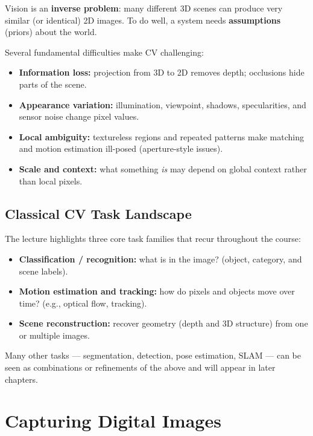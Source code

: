 \documentclass[11pt, oneside]{book}
\begin{document}
\begin{intbox}
Vision is an \textbf{inverse problem}: many different 3D scenes can produce very similar (or identical) 2D images.
To do well, a system needs \textbf{assumptions} (priors) about the world.
\end{intbox}

Several fundamental difficulties make CV challenging:
\begin{itemize}
  \item \textbf{Information loss:} projection from 3D to 2D removes depth; occlusions hide parts of the scene.
  \item \textbf{Appearance variation:} illumination, viewpoint, shadows, specularities, and sensor noise change pixel values.
  \item \textbf{Local ambiguity:} textureless regions and repeated patterns make matching and motion estimation ill-posed (aperture-style issues).
  \item \textbf{Scale and context:} what something \emph{is} may depend on global context rather than local pixels.
\end{itemize}

\section{Classical CV Task Landscape}

The lecture highlights three core task families that recur throughout the course:
\begin{itemize}
  \item \textbf{Classification / recognition:} what is in the image? (object, category, and scene labels).
  \item \textbf{Motion estimation and tracking:} how do pixels and objects move over time? (e.g., optical flow, tracking).
  \item \textbf{Scene reconstruction:} recover geometry (depth and 3D structure) from one or multiple images.
\end{itemize}

Many other tasks --- segmentation, detection, pose estimation, SLAM --- can be seen as combinations
or refinements of the above and will appear in later chapters.


\chapter{Capturing Digital Images}
\end{document}
